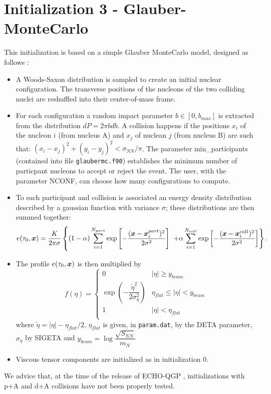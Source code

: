 \section{Initialization 3 - Glauber-MonteCarlo}\label{gmc}
This initialization is based on a simple Glauber MonteCarlo model, designed as follows \cite{Holopainen:2010gz}\cite{DelZanna:2013eua}:
\begin{itemize}
\item  A Woods-Saxon distribution is sampled to create an initial nuclear configuration. The transverse positions of the nucleons of the two colliding nuclei are reshuffled into their center-of-mass frame. 
\item For each configuration a random impact parameter $b\!\in\![0,b_{max}]$ is extracted from the distribution {$dP\!=\!2\pi bdb$}. A collision happens if the positions $x_i$ of the nucleon $i$ (from nucleus A) and $x_j$ of nuclean $j$ (from nucleus B) are such that: {$(x_i\!-\!x_j)^2\!+\!(y_i\!-\!y_j)^2<\sigma_{NN}/\pi$}. The parameter min\_participants (contained into file {\tt glaubermc.f90}) establishes the minimum number of particpant nucleons to accept or reject the event. The user, with the parameter NCONF, can choose how many configurations to compute.
\item To each participant and collision is associated an energy density distribution described by a gaussian function with variance $\sigma$; these distributions are then summed together:
\begin{displaymath}
e(\tau_0,{\boldsymbol x})=\frac{K}{2\pi\sigma}\left\{(1-\alpha)\sum_{i=1}^{N_{part}} 
  \exp\left[-\frac{({\boldsymbol x}-{\boldsymbol x}_i^{part})^2}{2\sigma^2} \right] \right.\\ 
\left.+\alpha\sum_{i=1}^{N_{coll}}\exp\left[-
  \frac{({\boldsymbol x}-{\boldsymbol x}_i^{coll})^2}{2\sigma^2}\right]\right\}.
\end{displaymath}
\item The profile $e(\tau_0,{\boldsymbol x})$ is then multiplied by
$$
f(\eta)=
\begin{cases}
0 & |\eta| \geq y_{beam}\\
\exp\left(-\dfrac{\tilde\eta^2}{2\sigma_{\eta}^2}\right)&\eta_{flat}\leq|\eta|<y_{beam}\\
1 & |\eta|<\eta_{flat}\\
\end{cases}
$$
where $\tilde\eta=|\eta|-\eta_{flat}/2$, $\eta_{flat}$ is given, in {\tt param.dat}, by the DETA parameter, $\sigma_{\eta}$ by SIGETA and $y_{beam}=\log\dfrac{\sqrt{S_{NN}}}{m_N}$
\item Viscous tensor components are initialized as in initialization 0.\\ 
\end{itemize}
We advice that, at the time of the release of ECHO-QGP \vnumber , initializations with p+A and d+A collisions have not been properly tested.
